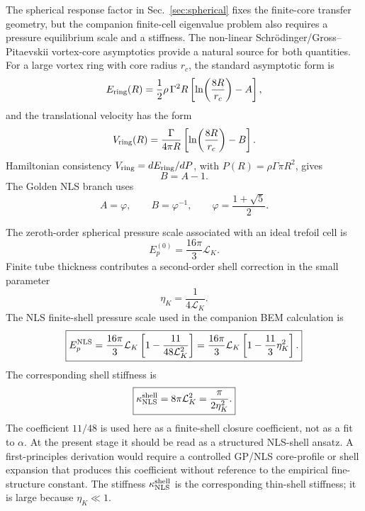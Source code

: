 \documentclass[11pt]{article}
\newcommand{\EpNLS}{E_p^{\rm NLS}}
\newcommand{\kappaNLS}{\kappa_{\rm NLS}^{\rm shell}}
\begin{document}
The spherical response factor in Sec.~\ref{sec:spherical} fixes the finite-core transfer
geometry, but the companion finite-cell eigenvalue problem also requires a pressure
equilibrium scale and a stiffness.  The non-linear Schrödinger/Gross--Pitaevskii vortex-core
asymptotics provide a natural source for both quantities.  For a large vortex ring with core
radius \(r_c\), the standard asymptotic form is
\begin{equation}
  E_{\rm ring}(R)
  =
  \frac{1}{2}\rho\,\Gamma^2 R
  \left[
    \ln\!\left(\frac{8R}{r_c}\right)-A
  \right],
  \label{eq:nls-ring-energy}
\end{equation}
and the translational velocity has the form
\begin{equation}
  V_{\rm ring}(R)
  =
  \frac{\Gamma}{4\pi R}
  \left[
    \ln\!\left(\frac{8R}{r_c}\right)-B
  \right].
  \label{eq:nls-ring-velocity}
\end{equation}
Hamiltonian consistency \(V_{\rm ring}=dE_{\rm ring}/dP\), with
\(P(R)=\rho\Gamma\pi R^2\), gives
\begin{equation}
  B=A-1.
  \label{eq:nls-hamiltonian-constraint}
\end{equation}
The Golden NLS branch uses
\begin{equation}
  A=\varphi,\qquad B=\varphi^{-1},
  \qquad
  \varphi=\frac{1+\sqrt5}{2}.
  \label{eq:golden-branch}
\end{equation}

The zeroth-order spherical pressure scale associated with an ideal trefoil cell is
\begin{equation}
  E_p^{(0)}
  =
  \frac{16\pi}{3}\mathcal L_K.
  \label{eq:Ep0}
\end{equation}
Finite tube thickness contributes a second-order shell correction in the small parameter
\begin{equation}
  \eta_K=\frac{1}{4\mathcal L_K}.
  \label{eq:eta-nls}
\end{equation}
The NLS finite-shell pressure scale used in the companion BEM calculation is
\begin{equation}
  \boxed{
  \EpNLS
  =
  \frac{16\pi}{3}\mathcal L_K
  \left[
  1-\frac{11}{48\mathcal L_K^2}
  \right]
  =
  \frac{16\pi}{3}\mathcal L_K
  \left[
  1-\frac{11}{3}\eta_K^2
  \right].
  }
  \label{eq:EpNLS}
\end{equation}
The corresponding shell stiffness is
\begin{equation}
  \boxed{
  \kappaNLS
  =
  8\pi\mathcal L_K^2
  =
  \frac{\pi}{2\eta_K^2}.
  }
  \label{eq:kappaNLS}
\end{equation}
The coefficient \(11/48\) is used here as a finite-shell closure coefficient, not as a fit to \(\alpha\).  At the present stage it should be read as a structured NLS-shell ansatz.  A first-principles derivation would require a controlled GP/NLS core-profile or shell expansion that produces this coefficient without reference to the empirical fine-structure constant.  The stiffness
\(\kappa_{\rm NLS}^{\rm shell}\) is the corresponding thin-shell stiffness; it is large
because \(\eta_K\ll1\).
\end{document}

